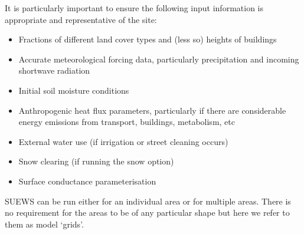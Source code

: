 \documentclass[letterpaper,10pt,english]{sphinxmanual}
\begin{document}
It is particularly important to ensure the following input information
is appropriate and representative of the site:
\begin{itemize}
\item {} 
Fractions of different land cover types and (less so) heights of
buildings \label{\detokenize{prepare-to-run-the-model:id2}}{\hyperref[\detokenize{references:w16}]{\sphinxcrossref{{[}W16{]}}}}

\item {} 
Accurate meteorological forcing data, particularly precipitation and
incoming shortwave radiation \label{\detokenize{prepare-to-run-the-model:id3}}{\hyperref[\detokenize{references:ko17}]{\sphinxcrossref{{[}Ko17{]}}}}

\item {} 
Initial soil moisture conditions \label{\detokenize{prepare-to-run-the-model:id4}}{\hyperref[\detokenize{references:best2014}]{\sphinxcrossref{{[}Best2014{]}}}}

\item {} 
Anthropogenic heat flux parameters, particularly if there are
considerable energy emissions from transport, buildings, metabolism,
etc \label{\detokenize{prepare-to-run-the-model:id5}}{\hyperref[\detokenize{references:w16}]{\sphinxcrossref{{[}W16{]}}}}

\item {} 
External water use (if irrigation or street cleaning occurs)

\item {} 
Snow clearing (if running the snow option)

\item {} 
Surface conductance parameterisation \label{\detokenize{prepare-to-run-the-model:id6}}{\hyperref[\detokenize{references:j11}]{\sphinxcrossref{{[}J11{]}}}} \label{\detokenize{prepare-to-run-the-model:id7}}{\hyperref[\detokenize{references:w16}]{\sphinxcrossref{{[}W16{]}}}}

\end{itemize}

SUEWS can be run either for an individual area or for multiple areas.
There is no requirement for the areas to be of any particular shape but
here we refer to them as model ‘grids’.
\end{document}
